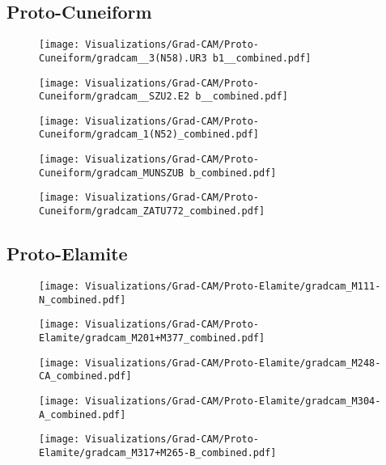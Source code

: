 \documentclass[11pt,a4paper,oneside]{report}
\begin{document}
\subsection{Proto-Cuneiform}
 \begin{figure}[H]
    \centering
    \texttt{[image: Visualizations/Grad-CAM/Proto-Cuneiform/gradcam\_\_3(N58).UR3~b1\_\_combined.pdf]}
\end{figure}

 \begin{figure}[H]
    \centering
    \texttt{[image: Visualizations/Grad-CAM/Proto-Cuneiform/gradcam\_\_SZU2.E2~b\_\_combined.pdf]}
\end{figure}

 \begin{figure}[H]
    \centering
    \texttt{[image: Visualizations/Grad-CAM/Proto-Cuneiform/gradcam\_1(N52)\_combined.pdf]}
\end{figure}

 \begin{figure}[H]
    \centering
    \texttt{[image: Visualizations/Grad-CAM/Proto-Cuneiform/gradcam\_MUNSZUB~b\_combined.pdf]}
\end{figure}

 \begin{figure}[H]
    \centering
    \texttt{[image: Visualizations/Grad-CAM/Proto-Cuneiform/gradcam\_ZATU772\_combined.pdf]}
\end{figure}

\subsection{Proto-Elamite}
 \begin{figure}[H]
    \centering
    \texttt{[image: Visualizations/Grad-CAM/Proto-Elamite/gradcam\_M111-N\_combined.pdf]}
\end{figure}
 \begin{figure}[H]
    \centering
    \texttt{[image: Visualizations/Grad-CAM/Proto-Elamite/gradcam\_M201+M377\_combined.pdf]}
\end{figure}
 \begin{figure}[H]
    \centering
    \texttt{[image: Visualizations/Grad-CAM/Proto-Elamite/gradcam\_M248-CA\_combined.pdf]}
\end{figure}
 \begin{figure}[H]
    \centering
    \texttt{[image: Visualizations/Grad-CAM/Proto-Elamite/gradcam\_M304-A\_combined.pdf]}
\end{figure}
 \begin{figure}[H]
    \centering
    \texttt{[image: Visualizations/Grad-CAM/Proto-Elamite/gradcam\_M317+M265-B\_combined.pdf]}
\end{figure}
\end{document}
